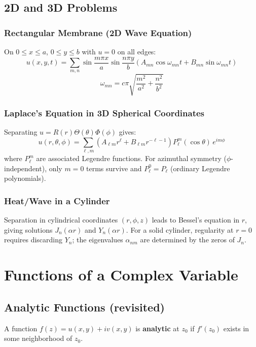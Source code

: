 \documentclass[11pt, letterpaper]{article}
\theoremstyle{plain}
\begin{document}
\subsection{2D and 3D Problems}

\subsubsection*{Rectangular Membrane (2D Wave Equation)}
On $0\leq x\leq a$, $0\leq y\leq b$ with $u=0$ on all edges:
\[
    u(x,y,t) = \sum_{m,n} \sin\frac{m\pi x}{a}\sin\frac{n\pi y}{b}
    \left(A_{mn}\cos\omega_{mn}t + B_{mn}\sin\omega_{mn}t\right)
\]
\[
    \omega_{mn} = c\pi\sqrt{\frac{m^2}{a^2} + \frac{n^2}{b^2}}
\]

\subsubsection*{Laplace's Equation in 3D Spherical Coordinates}
Separating $u = R(r)\Theta(\theta)\Phi(\phi)$ gives:
\[
    u(r,\theta,\phi) = \sum_{\ell,m}
    \left(A_{\ell m} r^\ell + B_{\ell m} r^{-\ell-1}\right)
    P_\ell^m(\cos\theta)\,e^{im\phi}
\]
where $P_\ell^m$ are associated Legendre functions. For azimuthal symmetry
($\phi$-independent), only $m=0$ terms survive and $P_\ell^0 = P_\ell$
(ordinary Legendre polynomials).

\subsubsection*{Heat/Wave in a Cylinder}
Separation in cylindrical coordinates $(r,\phi,z)$ leads to Bessel's equation
in $r$, giving solutions $J_n(\alpha r)$ and $Y_n(\alpha r)$. For a solid
cylinder, regularity at $r=0$ requires discarding $Y_n$; the eigenvalues
$\alpha_{nm}$ are determined by the zeros of $J_n$.

\newpage
\section{Functions of a Complex Variable}       %

\subsection{Analytic Functions (revisited)}

A function $f(z) = u(x,y) + iv(x,y)$ is \textbf{analytic} at $z_0$ if
$f'(z_0)$ exists in some neighborhood of $z_0$.
\end{document}
